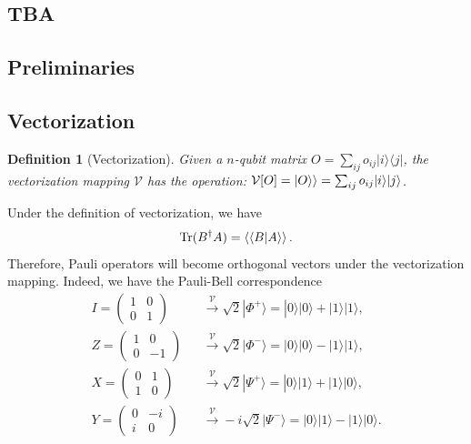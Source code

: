\documentclass[showpacs,amsmath,amssymb,twocolumn,superscriptaddress,notitlepage,preprintnumbers,aps,pra,10pt,floatfix]{revtex4-2}
\newtheorem{definition}{Definition}
\begin{document}
\subsection{TBA}

\clearpage
\begin{appendix}
\onecolumngrid
\renewcommand{\addcontentsline}{\oldacl}
\renewcommand{\tocname}{Appendix Contents}
\renewcommand\thetheorem{\arabic{pretheorem}}
\tableofcontents

\section{Preliminaries}
\subsection{Vectorization}
\begin{definition}[Vectorization]
Given a $n$-qubit matrix $O=\sum_{ij}o_{ij}|i\rangle\langle j|$, the vectorization mapping $\mathcal{V}$ has the operation: $\mathcal{V}[O]=\ket{O\rangle}=\sum_{ij}o_{ij}|i\rangle|j\rangle$. 
\end{definition}
Under the definition of vectorization, we have
\begin{eqnarray}
\mathrm{Tr}(B^\dag A)=\braket{\langle B|A\rangle}.
\end{eqnarray}
Therefore, Pauli operators will become orthogonal vectors under the vectorization mapping. Indeed, we have the Pauli-Bell correspondence
\begin{eqnarray}
I=\begin{pmatrix}1& 0\\0&1\end{pmatrix}&&\xrightarrow[]{\mathcal{V}}\sqrt{2}|\Phi^+\rangle=|0\rangle|0\rangle+|1\rangle|1\rangle\nonumber,\\
Z=\begin{pmatrix}1& 0\\0&-1\end{pmatrix}&&\xrightarrow[]{\mathcal{V}}\sqrt{2}|\Phi^-\rangle=|0\rangle|0\rangle-|1\rangle|1\rangle\nonumber,\\X=\begin{pmatrix}0& 1\\1&0\end{pmatrix}
&&\xrightarrow[]{\mathcal{V}}\sqrt{2}|\Psi^+\rangle=|0\rangle|1\rangle+|1\rangle|0\rangle\nonumber,\\
Y=\begin{pmatrix}0& -i\\i&0\end{pmatrix}&&\xrightarrow[]{\mathcal{V}}-i\sqrt{2}|\Psi^-\rangle=|0\rangle|1\rangle-|1\rangle|0\rangle.
\end{eqnarray}


\end{appendix}
\end{document}
